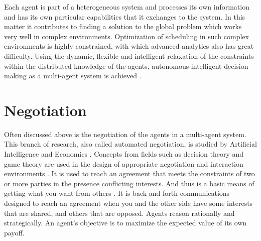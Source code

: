 Each agent is part of a heterogeneous system and processes its own information and has its own particular capabilities that it exchanges to the system. In this matter it contributes to finding a solution to the global problem which works very well in complex environments. Optimization of scheduling in such complex environments is highly constrained, with which advanced analytics also has great difficulty. Using the dynamic, flexible and intelligent relaxation of the constraints within the distributed knowledge of the agents, autonomous intelligent decision making as a multi-agent system is achieved \citep{rabelo1999multi}.




\clearpage
\section{Negotiation}
\label{sec:negotiation}
Often discussed above is the negotiation of the agents in a multi-agent system. This branch of research, also called automated negotiation, is studied by Artificial Intelligence and Economics \citep{jennings2001automated}. Concepts from fields such as decision theory and game theory are used in the design of appropriate negotiation and interaction environments \citep{jennings2001automated}. It is used to reach an agreement that meets the constraints of two or more parties in the presence conflicting interests. And thus is a basic means of getting what you want from others \citep{fisher1987getting}. It is back and forth communications designed to reach an agreement when you and the other side have some interests that are shared, and others that are opposed. Agents reason rationally and strategically. An agent's objective is to maximize the expected value of its own payoff. 

